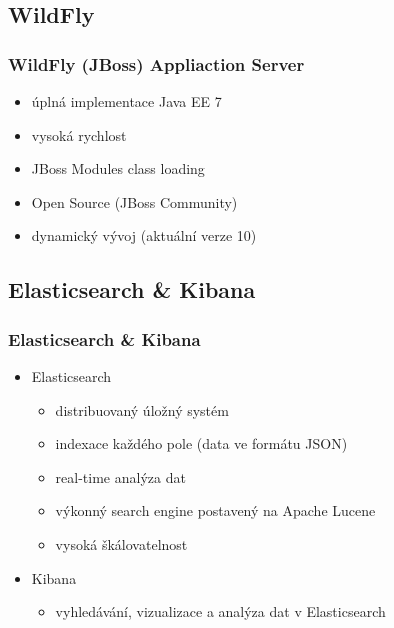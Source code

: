 \documentclass{beamer}
\begin{document}
\subsection{WildFly}
\begin{frame}
	\frametitle{WildFly (JBoss) Appliaction Server}
	\begin{itemize}
		\item úplná implementace Java EE 7
		\item vysoká rychlost
		\item JBoss Modules class loading
		\item Open Source (JBoss Community)
		\item dynamický vývoj (aktuální verze 10)
	\end{itemize}
\end{frame}

\subsection{Elasticsearch \& Kibana} %

\begin{frame}
\frametitle{Elasticsearch \& Kibana}
\begin{itemize}
	\item Elasticsearch
	\begin{itemize}
		\item distribuovaný úložný systém
		\item indexace každého pole (data ve formátu JSON)
		\item real-time analýza dat
		\item výkonný search engine postavený na Apache Lucene
		\item vysoká škálovatelnost
	\end{itemize}
	\item Kibana
	\begin{itemize}
		\item vyhledávání, vizualizace a analýza dat v Elasticsearch
	\end{itemize}
\end{itemize}
\end{frame}

\end{document}
